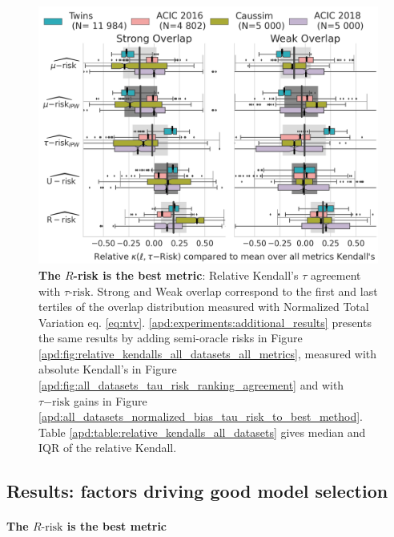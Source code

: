 \documentclass{report}
\begin{document}
\begin{figure}[!b]
  \centering
  \includegraphics[width=\linewidth]{img/chapter_5/_1_r_risk_domination_r_risk_domination__ref_metric_mean_risks_by_Dataset_feasible_only.png}
  \caption{\textbf{The $R$-risk is the best metric}: Relative Kendall's $\tau$ agreement with $\tau\text{-risk}$.
    Strong and Weak overlap correspond to the first and last tertiles of the overlap distribution measured with
    Normalized Total Variation eq. \ref{eq:ntv}. \ref{apd:experiments:additional_results} presents the same results
    by adding semi-oracle risks in Figure \ref{apd:fig:relative_kendalls_all_datasets_all_metrics}, measured with
    absolute Kendall's in Figure \ref{apd:fig:all_datasets_tau_risk_ranking_agreement} and with $\tau\mathrm{-risk}$
    gains in Figure \ref{apd:all_datasets_normalized_bias_tau_risk_to_best_method}. Table
    \ref{apd:table:relative_kendalls_all_datasets} gives median and
    IQR of the relative Kendall.}\label{fig:relative_kendalls_all_datasets}
\end{figure}

\subsection{Results: factors driving good model selection}%
\label{subsec:causal_model_selection:empirical_results}%

\paragraph{The $R\text{-risk}$ is the best metric}
\end{document}
